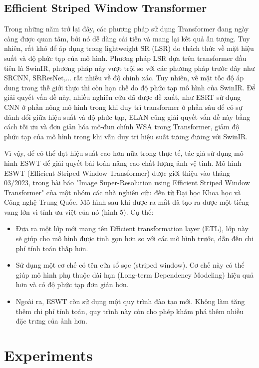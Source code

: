 \documentclass[conference]{IEEEtran}
\begin{document}
\subsection{Efficient Striped Window Transformer} \label{sect:tensorrt}
Trong những năm trở lại đây, các phương pháp sử dụng Transformer đang ngày càng được quan tâm, bởi nó dễ dàng cải tiến và mang lại kết quả ấn tượng. Tuy nhiên, rất khó để áp dụng trong lightweight SR (LSR) do thách thức về mặt hiệu suất và độ phức tạp của mô hình. Phương pháp LSR dựa trên transformer đầu tiên là SwinIR, phương pháp này vượt trội so với các phương pháp trước đây như SRCNN, SRResNet,... rất nhiều về độ chính xác. Tuy nhiên, về mặt tốc độ áp dung trong thế giới thực thì còn hạn chế do độ phức tạp mô hình của SwinIR. Để giải quyết vấn đề này, nhiều nghiên cứu đã được đề xuất, như ESRT sử dụng CNN ở phần nông mô hình trong khi duy trì transformer ở phần sâu để có sự đánh đổi giữa hiệu suất và độ phức tạp, ELAN cũng giải quyết vấn đề này bằng cách tối ưu và đơn giản hóa mô-đun chính WSA trong Transformer, giảm độ phức tạp của mô hình trong khi vẫn duy trì hiệu suất tương đương với SwinIR.

Vì vậy, để có thể đạt hiệu suất cao hơn nữa trong thực tế, tác giả sử dụng mô hình ESWT để giải quyết bài toán nâng cao chất lượng ảnh vệ tinh. Mô hình ESWT (Efficient Striped Window Transformer) được giới thiệu vào tháng 03/2023, trong bài báo "Image Super-Resolution using Efficient Striped Window Transformer" của một nhóm các nhà nghiên cứu đến từ Đại học Khoa học và Công nghệ Trung Quốc. Mô hình sau khi được ra mắt đã tạo ra được
một tiếng vang lớn vì tính ưu việt của nó (hình 5). Cụ thể:
\begin{itemize}
 \item Đưa ra một lớp mới mang tên Efficient transformation layer (ETL), lớp này sẽ giúp cho mô hình được tinh gọn hơn so với các mô hình trước, dẫn đến chi phí tính toán thấp hơn.
 \item Sử dụng một cơ chế có tên cửa sổ sọc (striped window). Cơ chế này có thể giúp mô hình phụ thuộc dài hạn (Long-term Dependency Modeling) hiệu quả hơn và có độ phức tạp đơn giản hơn.
 \item Ngoài ra, ESWT còn sử dụng một quy trình đào tạo mới. Không làm tăng thêm chi phí tính toán, quy trình này còn cho phép khám phá thêm nhiều đặc trưng của ảnh hơn.
\end{itemize}




\section{Experiments} \label{sect:experiment}
\end{document}
